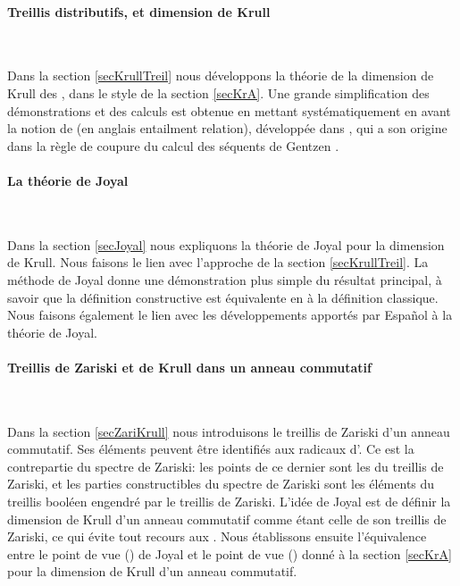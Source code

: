 \paragraph{Treillis  distributifs, \entrel et dimension de Krull}~

\noindent Dans la section \ref{secKrullTreil}  nous développons la 
théorie \cov de la dimension de Krull des \trdis,  dans le 
style de la section  \ref{secKrA}. Une grande simplification des démonstrations et des calculs est obtenue
en mettant systématiquement en avant la notion de \entrel (en anglais 
entailment relation), développée dans \cite{cc}, qui a son origine dans la règle de coupure du 
calcul des séquents de Gentzen%
. 

\paragraph{La théorie de Joyal}~

\noindent Dans la section \ref{secJoyal} nous expliquons  la 
théorie de Joyal pour la dimension de Krull. Nous faisons le lien avec l'approche de la section \ref{secKrullTreil}. La méthode de Joyal donne une démonstration plus simple du résultat principal, à savoir que la définition constructive est équivalente en \clama à la définition classique. 
Nous faisons également le lien avec les
développements apportés par Espa\~nol à la théorie de Joyal.


\paragraph{Treillis de Zariski et de Krull dans un anneau commutatif}~

\noindent Dans la section \ref{secZariKrull}  nous introduisons  le
treillis de Zariski d'un anneau commutatif. Ses éléments peuvent être identifiés aux 
radicaux d'\itfs. Ce \trdi est la contrepartie \cov du spectre de Zariski: 
les points de ce dernier sont les \ideps du treillis de Zariski, et les 
parties constructibles du spectre de Zariski sont les éléments du 
treillis booléen engendré par le  treillis de Zariski.
L'idée de Joyal est de définir
la dimension de Krull d'un anneau commutatif comme étant celle de son
treillis de Zariski, ce qui évite tout recours aux \ideps.
Nous établissons ensuite l'équivalence entre le point de vue (\cof) 
de Joyal et le point de vue (\cof) donné à la section  \ref{secKrA} 
pour la dimension de Krull d'un anneau commutatif.


